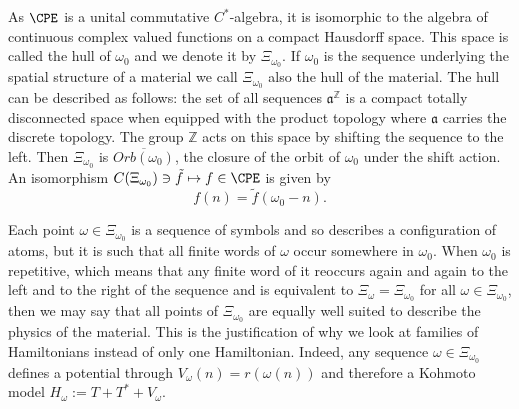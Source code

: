 \documentclass[11pt]{amsart}
\newcommand{\Z}{\mathbb{Z}}
\begin{document}

As $\CPE$ is a unital commutative $C^*$-algebra, it is isomorphic to the algebra of continuous complex valued functions on a compact Hausdorff space. This space is called the hull of $\omega_0$ and we denote it by
$\Xi_{\omega_0}$. If $\omega_0$ is the sequence underlying the spatial structure of a material we call $\Xi_{\omega_0}$ also the hull of the material. The hull can be described as follows: the set of all sequences $\mathfrak a^\Z$ is a compact totally disconnected space when equipped with the product topology where $\mathfrak a$ carries the discrete topology. The group $\Z$ acts on this space by shifting the sequence to the left. Then $\Xi_{\omega_0}$ is $\overline{Orb(\omega_0)}$, the closure of the orbit of $\omega_0$ under the shift action. An isomorphism 
$C(\Xi_{\omega_0})\ni \tilde f \mapsto f \in  \CPE$ is given by $$f(n) = \tilde f(\omega_0-n).$$

Each point $\omega\in\Xi_{\omega_0}$ is a sequence of symbols and so  describes a configuration of atoms, but it is such that all finite words of $\omega$ occur somewhere in $\omega_0$. 
When $\omega_0$ is repetitive, which means that any finite word of it reoccurs again and again to the left and to the right of the sequence and is equivalent to $\Xi_\omega = \Xi_{\omega_0}$ 
for all $\omega\in\Xi_{\omega_0}$, 
then we may say that all points of $\Xi_{\omega_0}$ are equally well suited to describe the physics of the material. This is the justification of why we look 
at families of Hamiltonians instead of only one Hamiltonian. Indeed, any sequence $\omega\in\Xi_{\omega_0}$ defines a potential 
through $V_\omega(n) = r(\omega(n))$ and therefore a Kohmoto model $H_\omega := T + T^* + V_\omega$.
\end{document}
